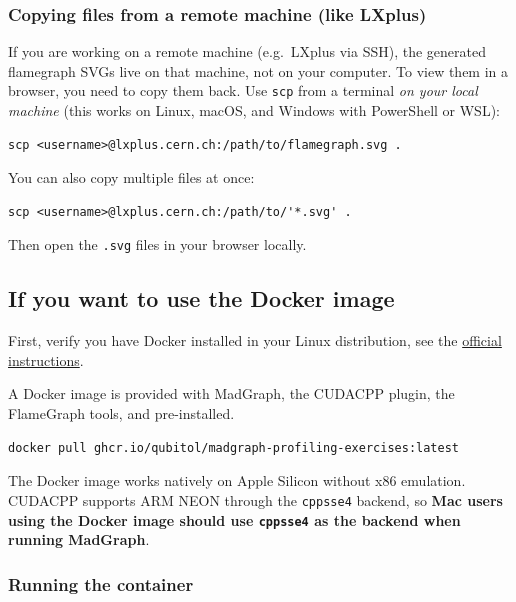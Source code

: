 \documentclass[11pt,a4paper]{article}
\begin{document}
\subsubsection{Copying files from a remote machine (like LXplus)}
\label{sec:scp}

If you are working on a remote machine (e.g.\ LXplus via SSH), the generated flamegraph SVGs live on that machine, not on your computer.
To view them in a browser, you need to copy them back.
Use \texttt{scp} from a terminal \emph{on your local machine} (this works on Linux, macOS, and Windows with PowerShell or WSL):

\begin{lstlisting}[style=bashstyle]
scp <username>@lxplus.cern.ch:/path/to/flamegraph.svg .
\end{lstlisting}

You can also copy multiple files at once:
\begin{lstlisting}[style=bashstyle]
scp <username>@lxplus.cern.ch:/path/to/'*.svg' .
\end{lstlisting}

Then open the \texttt{.svg} files in your browser locally.

\subsection{If you want to use the Docker image}
First, verify you have Docker installed in your Linux distribution, see the \href{https://docs.docker.com/engine/install/}{official instructions}.

A Docker image is provided with MadGraph, the CUDACPP plugin, the FlameGraph tools, and \perf pre-installed.

\begin{lstlisting}
docker pull ghcr.io/qubitol/madgraph-profiling-exercises:latest
\end{lstlisting}

\begin{tipbox}
The Docker image works natively on Apple Silicon without x86 emulation.
CUDACPP supports ARM NEON through the \texttt{cppsse4} backend, so \textbf{Mac users using the Docker image should use \texttt{cppsse4} as the backend when running MadGraph}.
\end{tipbox}

\subsubsection{Running the container}
\end{document}
